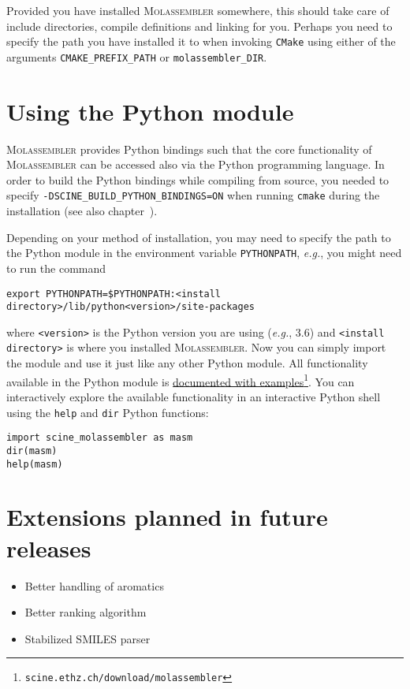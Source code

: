 \documentclass[]{tufte-book}
\begin{document}
Provided you have installed \textsc{Molassembler} somewhere, this should take
care of include directories, compile definitions and linking for you. Perhaps
you need to specify the path you have installed it to when invoking
\texttt{CMake} using either of the arguments \texttt{CMAKE\_PREFIX\_PATH} or
\texttt{molassembler\_DIR}.

\newpage
\chapter{Using the Python module}

\textsc{Molassembler} provides Python bindings such that the core functionality
of \textsc{Molassembler} can be accessed also via the Python programming
language. In order to build the Python bindings while compiling from source, you
needed to specify \texttt{-DSCINE\_BUILD\_PYTHON\_BINDINGS=ON} when running
\texttt{cmake} during the installation (see also
chapter~).

Depending on your method of installation, you may need to specify the path to
the Python module in the environment variable \texttt{PYTHONPATH},
\textit{e.g.}, you might need to run the command 

\begin{Verbatim} 
export PYTHONPATH=$PYTHONPATH:<install directory>/lib/python<version>/site-packages 
\end{Verbatim} 

where \texttt{<version>} is the Python version you are using (\textit{e.g.},
3.6) and \texttt{<install directory>} is where you installed
\textsc{Molassembler}. Now you can simply import the module and use it just
like any other Python module. All functionality available in the Python module
is
\href{https://scine.ethz.ch/static/download/documentation/molassembler/v1.2.1/py}{documented with
examples}\footnote{\texttt{scine.ethz.ch/download/molassembler}}. You can
interactively explore the available functionality in an interactive Python shell
using the \texttt{help} and \texttt{dir} Python functions:

\begin{Verbatim}
import scine_molassembler as masm
dir(masm)
help(masm)
\end{Verbatim}

\chapter{Extensions planned in future releases}
\begin{itemize}
  \item Better handling of aromatics
  \item Better ranking algorithm
  \item Stabilized SMILES parser
\end{itemize}
\end{document}
